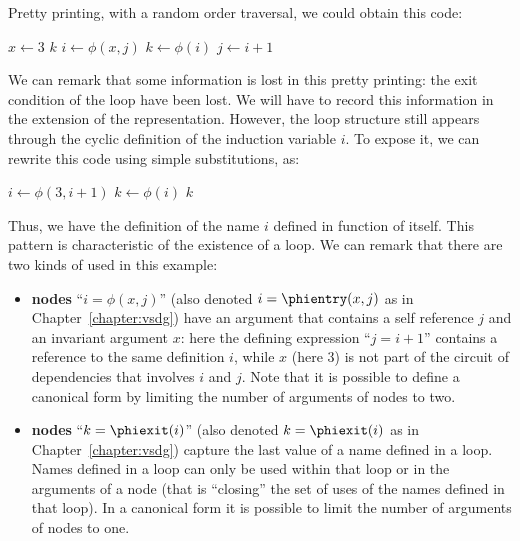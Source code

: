 {\noindent
Pretty printing, with a random order traversal, we could obtain this \SSA{} code:

\begin{algorithm}[H]
$x\gets 3$\;
\Return $k$\;
$i\gets \phi(x,j)$\;
$k\gets\phi(i)$\;
$j\gets i+1$\;
\end{algorithm}

We can remark that some information is lost in this pretty printing: 
the exit condition of the loop have been lost. 
We will have to record this information in the extension of the \SSA{} representation. 
However, the loop structure still appears through the cyclic definition of the induction variable $i$. 
To expose it, we can rewrite this \SSA{} code using simple substitutions, as:

\begin{algorithm}[H]
$i\gets \phi(3,i+1)$\;
$k\gets\phi(i)$\;
\Return $k$\;
\end{algorithm}


\noindent
Thus, we have the definition of the \SSA{} name $i$ defined in function of itself. 
This pattern is characteristic of the existence of a loop. 
We can remark that there are two kinds of \phinodes used in this example:
\begin{itemize}
\item {\bf \loopphi{} nodes}  ``$i = \phi (x, j)$'' (also denoted $i = \phientry (x, j)$ as in Chapter~\ref{chapter:vsdg}) have an argument that contains a self reference $j$ and an invariant argument
$x$: 
here the defining expression ``$j = i + 1$'' contains a reference to the same \loopphi{} definition $i$, while $x$ (here $3$) is not part of the circuit of dependencies that involves $i$ and $j$.
Note that it is possible to define a canonical \SSA{} form by limiting the number of arguments of \loopphi{} nodes to two.
\item {\bf \closephi{} nodes} ``$k = \phiexit (i)$'' (also denoted $k = \phiexit (i)$ as in Chapter~\ref{chapter:vsdg}) capture the last value of a name defined in a loop. 
Names defined in a loop can only be used within that loop or in the arguments of a \closephi{} node (that is ``closing'' the set of uses of the names defined in that loop).
In a canonical \SSA{} form it is possible to limit the number of arguments of \closephi{} nodes to one.
\end{itemize}

}
